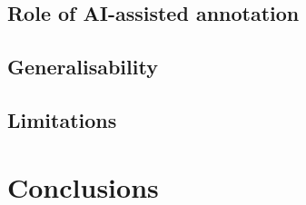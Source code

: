 \documentclass[12pt]{article}
\begin{document}
{\subsection{Role of AI-assisted annotation}


\subsection{Generalisability}


\subsection{Limitations}




\section{Conclusions}



}
\end{document}
